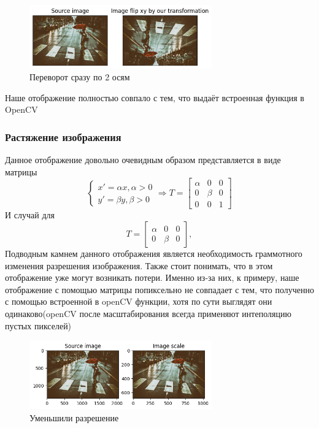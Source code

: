 \documentclass[a4paper,12pt]{article}
\begin{document}
\begin{figure}[H]
    \centering \includegraphics[width=0.7\textwidth]{my_images/12.png}
    \caption{Переворот сразу по 2 осям}
\end{figure}
Наше отображение полностью совпало с тем, что выдаёт встроенная функция в OpenCV
\subsubsection{Растяжение изображения}
Данное отображение довольно очевидным образом представляется в виде матрицы
$$
	\begin{cases}
		x'={\alpha}x, \alpha > 0 \\
		y'={\beta}y, \beta > 0
	\end{cases}
	\Rightarrow
	T=
	\begin{bmatrix}
		\alpha & 0 & 0
		\\ 0 & \beta & 0
		\\ 0 & 0 & 1
	\end{bmatrix}
$$
И случай для 
$$
	T =
	\begin{bmatrix}
		\alpha & 0 & 0
		\\ 0 & \beta & 0
	\end{bmatrix},
$$
Подводным камнем данного отображения является необходимость граммотного изменения разрешения изображения. Также стоит понимать, что в этом отображение уже могут возникать потери. Именно из-за них, к примеру, наше отображение с помощью матрицы попиксельно не совпадает с тем, что полученно с помощью встроенной в openCV функции, хотя по сути выглядят они одинаково(openCV после масштабирования всегда применяют интеполяцию пустых пикселей)
\begin{figure}[H]
    \centering \includegraphics[width=0.7\textwidth]{my_images/14.png}
    \caption{Уменьшили разрешение}
\end{figure}
\end{document}
